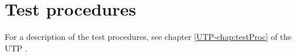 \chapter{Test procedures}
\label{chap:testProcedures}

For a description of the test procedures, see chapter \ref{UTP-chap:testProc} of the UTP \cite{utp}.\\
